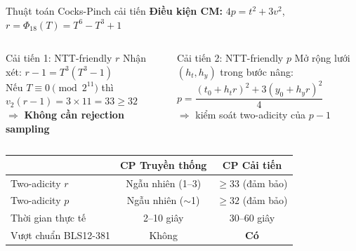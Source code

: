 \begin{frame}{Thuật toán Cocks-Pinch cải tiến}
  \textbf{Điều kiện CM:} $4p = t^2 + 3v^2$,\quad
  $r = \Phi_{18}(T) = T^6 - T^3 + 1$
  \vspace{0.5em}

  \begin{columns}[t]
      \begin{alertblock}{Cải tiến 1: NTT-friendly $r$}
        Nhận xét: $r - 1 = T^3(T^3 - 1)$\\[4pt]
        Nếu $T \equiv 0 \pmod{2^{11}}$ thì\\
        $v_2(r-1) = 3\times 11 = 33 \geq 32$\\[4pt]
        $\Rightarrow$ \textbf{Không cần rejection sampling}
      \end{alertblock}
      \begin{alertblock}{Cải tiến 2: NTT-friendly $p$}
        Mở rộng lưới $(h_t, h_y)$ trong bước nâng:\\
        $p = \dfrac{(t_0 + h_t r)^2 + 3(y_0 + h_y r)^2}{4}$\\[4pt]
        $\Rightarrow$ kiểm soát two-adicity của $p-1$
      \end{alertblock}
  \end{columns}
  \vspace{0.5em}
  \begin{table}
    \small
    \begin{tabular}{lcc}
      \toprule
      & CP Truyền thống & CP Cải tiến \\
      \midrule
      Two-adicity $r$ & Ngẫu nhiên (1--3) & $\geq 33$ (đảm bảo) \\
      Two-adicity $p$ & Ngẫu nhiên ($\sim$1) & $\geq 32$ (đảm bảo) \\
      Thời gian thực tế & 2--10 giây & 30--60 giây \\
      Vượt chuẩn BLS12-381 & Không & \textbf{Có} \\
      \bottomrule
    \end{tabular}
  \end{table}
\end{frame}
